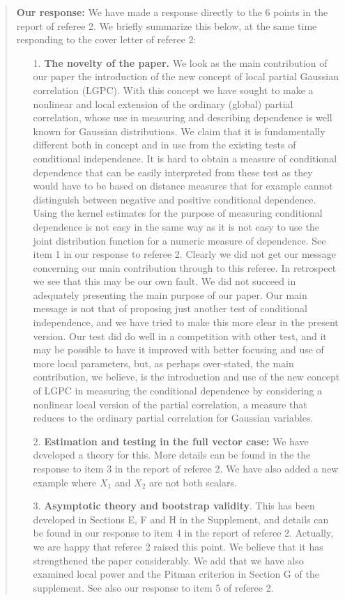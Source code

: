 \documentclass[
  12pt,
  letterpaper]{article}
\numberwithin{equation}{section}
\begin{document}
\begin{quote}
\textbf{Our response:} We have made a response directly to the 6 points in the report of referee 2. We briefly summarize this below, at the same time responding to the cover letter of referee 2:

\begin{itemize}
\item[1.] \textbf{The novelty of the paper.} We look as the main contribution of our paper the introduction of the new concept of local partial Gaussian correlation (LGPC). With this concept we have sought to make a nonlinear and local extension of the ordinary (global) partial correlation, whose use in measuring and describing dependence is well known for Gaussian distributions. We claim that it is fundamentally different both in concept and in use from the existing tests of conditional independence. It is hard to obtain a measure of conditional dependence that can be easily interpreted from these test as they would have to be based on distance measures that for example cannot distinguish between negative and positive conditional dependence.
\vspace{.3cm} \newline 
Using the kernel estimates for the purpose of measuring conditional dependence is not easy in the same way as it is not easy to use the joint distribution function for a numeric measure of dependence. See item 1 in our response to referee 2. 
\vspace{.3cm} \newline 
Clearly we did not get our message concerning our main contribution through to this referee. In retrospect we see that this may be our own fault. We did not succeed in adequately presenting the main purpose of our paper. Our main message is not that of proposing just another test of conditional independence,
and we have tried to make this more clear in the present version. Our test did do well in a competition with other test, and it may be possible to have it improved with better focusing and use of more local parameters, but, as perhaps over-stated, the main contribution, we believe, is the introduction and use of the new concept of LGPC in measuring the conditional dependence by considering a nonlinear local version of the partial correlation, a measure that reduces to the ordinary partial correlation for Gaussian variables.
\item [2.] \textbf{Estimation and testing in the full vector case:} 
We have developed a theory for this. More details can be found in the the response to item 3 in the report of referee 2. We have also added a new example where $X_1$ and $X_2$ are not both scalars.
\item [3.] \textbf{Asymptotic theory and bootstrap validity}. 
This has been developed in Sections E, F and H in the Supplement, and details can be found in our response to item 4 in the report of referee 2. Actually, we are happy that referee 2 raised this point. We believe that it has strengthened the paper considerably. We add that we have also examined local power and the Pitman criterion in Section  G of the supplement. See also our response to item 5 of referee 2.
\end{itemize}
\end{quote}
\end{document}

